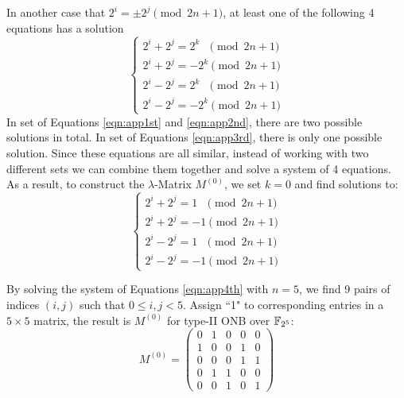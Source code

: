 In another case that $2^i = \pm 2^j \pmod{2n+1}$, at least one of the following 4 equations has a solution
\begin{equation}
\label{eqn:app3rd}
\begin{cases}
2^i + 2^j = 2^k ~~~\pmod{2n+1}\\
2^i + 2^j = -2^k \pmod{2n+1}\\
2^i - 2^j = 2^k ~~~\pmod{2n+1}\\
2^i - 2^j = -2^k \pmod{2n+1}
\end{cases}
\end{equation}
In set of Equations \ref{eqn:app1st} and \ref{eqn:app2nd}, there are two possible solutions in total. 
In set of Equations \ref{eqn:app3rd},
there is only one possible solution. Since these equations are all similar, instead of 
working with two different sets we can combine them together and solve a system of 4 equations. 
As a result, to construct 
the $\lambda$-Matrix $M^{(0)}$, we set $k=0$ and find solutions to:
\begin{equation}
\label{eqn:app4th}
\begin{cases}
2^i + 2^j = 1 ~~~\pmod{2n+1}\\
2^i + 2^j = -1 \pmod{2n+1}\\
2^i - 2^j = 1 ~~~\pmod{2n+1}\\
2^i - 2^j = -1 \pmod{2n+1}
\end{cases}
\end{equation}

\begin{Example} 
By solving the system of Equations \ref{eqn:app4th} with $n=5$, we find 9 pairs of
indices $(i,j)$ such that $0\leq i,j <5$. Assign ``1" to corresponding entries in a $5\times5$ matrix,
the result is $M^{(0)}$ for type-II ONB over ${\mathbb{F}}_{2^5}$:
\begin{equation}
M^{(0)} = \left(
\begin{array}{lcccr}
0 & 1 & 0 & 0 & 0\\
1 & 0 & 0 & 1 & 0\\
0 & 0 & 0 & 1 & 1\\
0 & 1 & 1 & 0 & 0\\
0 & 0 & 1 & 0 & 1
\end{array} \right)
\end{equation}
\end{Example}

